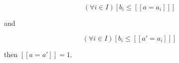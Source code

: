 $$(\forall i \in I)[b_i \leq [[a = a_i]]]$$

and

$$(\forall i \in I)[b_i \leq [[a' = a_i]]]$$

then $[[a = a']] = 1$.
